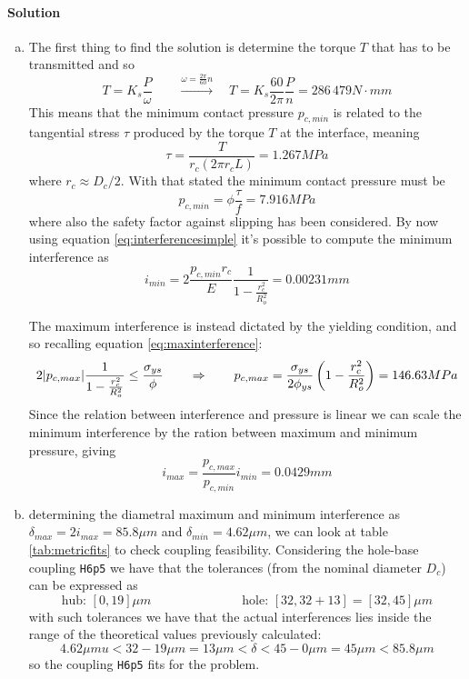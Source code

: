 	\paragraph{Solution}
\begin{enumerate}[a)]
	
	\item The first thing to find the solution is determine the torque $T$ that has to be transmitted and so
	\[ T =  K_s \frac P \omega \qquad \xrightarrow{\omega = \frac{2\pi}{60} n} \quad T = K_s \frac{60}{2\pi} \frac{P}{n} = 286\, 479 N\cdot mm \]
	This means that the minimum contact pressure $p_{c,min}$ is related to the tangential stress $\tau$ produced by the torque $T$ at the interface, meaning
	\[ \tau = \frac{T}{r_c (2\pi r_cL)} = 1.267 MPa \]
	where $r_c \approx D_c/2$. With that stated the minimum contact pressure must be
	\[ p_{c,min} = \phi \frac \tau f = 7.916MPa \]
	where also the safety factor against slipping has been considered. By now using equation \ref{eq:interferencesimple} it's possible to compute the minimum interference as
	\[ i_{min} = 2 \frac{p_{c,min} r_c}{E} \frac 1 {1-\frac{r_c^2}{R_o^2}} = 0.00231 mm \]
	
	The maximum interference is instead dictated by the yielding condition, and so recalling equation \ref{eq:maxinterference}:
	\[2 |p_{c,max}| \frac 1 {1- \frac{r_c^2}{R_o^2}} \leq \frac{\sigma_{ys}}{\phi} \qquad \Rightarrow \qquad p_{c,max} = \frac{\sigma_{ys}}{2\phi_{ys}} \left( 1 - \frac{r_c^2}{R_o^2} \right) = 146.63 MPa \]
	Since the relation between interference and pressure is linear we can scale the minimum interference by the ration between maximum and minimum pressure, giving
	\[ i_{max} = \frac{p_{c,max}}{p_{c,min}} i_{min} = 0.0429 mm\]
	
	\item determining the diametral maximum and minimum interference as $\delta_{max} = 2i_{max} = 85.8\mu m$ and $\delta_{min} =  4.62\mu m$, we can look at table \ref{tab:metricfits} to check coupling feasibility. Considering the hole-base coupling \texttt{H6p5} we have that the tolerances (from the nominal diameter $D_c$) can be expressed as
	\[ \textrm{hub: } [0,19] \mu m \hspace{3cm} \textrm{hole: } [32, 32+13] = [32, 45]\mu m \]
	with such tolerances we have that the actual interferences lies inside the range of the theoretical values previously calculated:
	\[ 4.62 \mu mu < 32-19 \mu m = 13 \mu m < \delta < 45-0 \mu m = 45 \mu m < 85.8 \mu m \] 
	so the coupling \texttt{H6p5} fits for the problem.
	

\end{enumerate}
